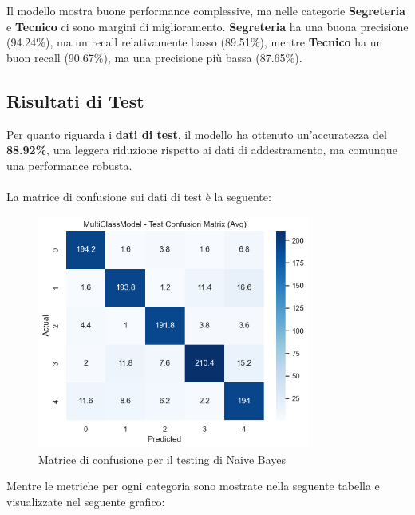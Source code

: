Il modello mostra buone performance complessive, ma nelle categorie \textbf{Segreteria} e \textbf{Tecnico} ci sono margini di miglioramento. \textbf{Segreteria} ha una buona precisione (94.24\%), ma un recall relativamente basso (89.51\%), mentre \textbf{Tecnico} ha un buon recall (90.67\%), ma una precisione più bassa (87.65\%).


\newpage

\subsection{Risultati di Test}

Per quanto riguarda i \textbf{dati di test}, il modello ha ottenuto un'accuratezza del \textbf{88.92\%}, una leggera riduzione rispetto ai dati di addestramento, ma comunque una performance robusta. \\ \\
La matrice di confusione sui dati di test è la seguente:

\begin{figure}[H]
    \centering
    \includegraphics[width=0.8\textwidth]{images/confusion_matrix_test_naive_bayes.png}
    \caption{Matrice di confusione per il testing di Naive Bayes}
    \label{fig:confusion_matrix_test_naive_bayes}
\end{figure}

Mentre le metriche per ogni categoria sono mostrate nella seguente tabella e visualizzate nel seguente grafico:

